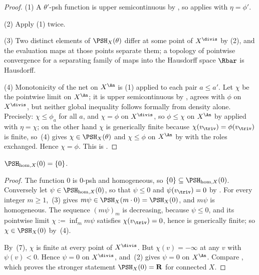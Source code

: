\begin{proof}
(1)  A $\theta'$-psh function is upper semicontinuous by
, so  applies with
$\eta=\phi'$.

(2)  Apply (1) twice.

(3)  Two distinct elements of $\PSH_X(\theta)$ differ at some point of
$X^{\divis}$ by (2), and the evaluation maps at those points separate
them; a topology of pointwise convergence for a separating family of maps
into the Hausdorff space $\Rbar$ is Hausdorff.

(4)  Monotonicity of the net on $X^{\An}$ is (1) applied to each pair
$a\leq a'$.  Let $\chi$ be the pointwise limit on $X^{\An}$; it is
upper semicontinuous by , agrees with $\phi$ on
$X^{\divis}$, but neither global inequality follows formally from
density alone.  Precisely: $\chi\leq\phi_a$ for all $a$, and
$\chi=\phi$ on $X^{\divis}$, so $\phi\leq\chi$ on $X^{\An}$ by
 applied with $\eta=\chi$; on the
other hand $\chi$ is generically finite because
$\chi(v_{\triv})=\phi(v_{\triv})$ is finite, so
\,(4) gives $\chi\in\PSH_X(\theta)$ and
$\chi\leq\phi$ on $X^{\An}$ by
 with the roles exchanged.  Hence
$\chi=\phi$.  This is \cite[Corollaries~4.23 and~4.25]{BJ22}.
\end{proof}

\begin{corollary}
\label{cor:ch35-zero-class}
$\PSH_{\mathrm{hom},X}(0)=\{0\}$.
\end{corollary}

\begin{proof}
The function $0$ is $0$-psh and homogeneous, so
$\{0\}\subseteq\PSH_{\mathrm{hom},X}(0)$.  Conversely let
$\psi\in\PSH_{\mathrm{hom},X}(0)$, so that $\psi\leq0$ and
$\psi(v_{\triv})=0$ by
.  For every integer
$m\geq1$, \,(3) gives
$m\psi\in\PSH_X(m\cdot0)=\PSH_X(0)$, and $m\psi$ is homogeneous.  The
sequence $(m\psi)_m$ is decreasing, because $\psi\leq0$, and its
pointwise limit $\chi:=\inf_m m\psi$ satisfies
$\chi(v_{\triv})=0$, hence is generically finite; so
$\chi\in\PSH_X(0)$ by \,(4).

By \,(7), $\chi$ is finite at every point of
$X^{\divis}$.  But $\chi(v)=-\infty$ at any $v$ with
$\psi(v)<0$.  Hence $\psi=0$ on $X^{\divis}$, and
\,(2) gives $\psi=0$ on
$X^{\An}$.  Compare \cite[Corollary~4.24]{BJ22}, which proves the stronger
statement $\PSH_X(0)=\mathbf R$ for connected $X$.
\end{proof}

